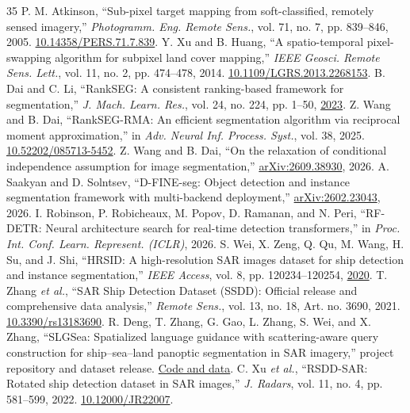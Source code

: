 \documentclass[journal]{IEEEtran}
\begin{document}
\begin{thebibliography}{35}
 P. M. Atkinson, ``Sub-pixel target mapping from soft-classified, remotely sensed imagery,'' \emph{Photogramm. Eng. Remote Sens.}, vol. 71, no. 7, pp. 839--846, 2005. \href{https://doi.org/10.14358/PERS.71.7.839}{10.14358/PERS.71.7.839}.
 Y. Xu and B. Huang, ``A spatio-temporal pixel-swapping algorithm for subpixel land cover mapping,'' \emph{IEEE Geosci. Remote Sens. Lett.}, vol. 11, no. 2, pp. 474--478, 2014. \href{https://doi.org/10.1109/LGRS.2013.2268153}{10.1109/LGRS.2013.2268153}.
 B. Dai and C. Li, ``RankSEG: A consistent ranking-based framework for segmentation,'' \emph{J. Mach. Learn. Res.}, vol. 24, no. 224, pp. 1--50, \href{https://www.jmlr.org/papers/v24/22-0712.html}{2023}.
 Z. Wang and B. Dai, ``RankSEG-RMA: An efficient segmentation algorithm via reciprocal moment approximation,'' in \emph{Adv. Neural Inf. Process. Syst.}, vol. 38, 2025. \href{https://doi.org/10.52202/085713-5452}{10.52202/085713-5452}.
 Z. Wang and B. Dai, ``On the relaxation of conditional independence assumption for image segmentation,'' \href{https://arxiv.org/abs/2609.38930}{arXiv:2609.38930}, 2026.
 A. Saakyan and D. Solntsev, ``D-FINE-seg: Object detection and instance segmentation framework with multi-backend deployment,'' \href{https://arxiv.org/abs/2602.23043}{arXiv:2602.23043}, 2026.
 I. Robinson, P. Robicheaux, M. Popov, D. Ramanan, and N. Peri, ``RF-DETR: Neural architecture search for real-time detection transformers,'' in \emph{Proc. Int. Conf. Learn. Represent. (ICLR)}, 2026.
 S. Wei, X. Zeng, Q. Qu, M. Wang, H. Su, and J. Shi, ``HRSID: A high-resolution SAR images dataset for ship detection and instance segmentation,'' \emph{IEEE Access}, vol. 8, pp. 120234--120254, \href{https://doi.org/10.1109/ACCESS.2020.3005861}{2020}.
 T. Zhang \emph{et al.}, ``SAR Ship Detection Dataset (SSDD): Official release and comprehensive data analysis,'' \emph{Remote Sens.}, vol. 13, no. 18, Art. no. 3690, 2021. \href{https://doi.org/10.3390/rs13183690}{10.3390/rs13183690}.
 R. Deng, T. Zhang, G. Gao, L. Zhang, S. Wei, and X. Zhang, ``SLGSea: Spatialized language guidance with scattering-aware query construction for ship--sea--land panoptic segmentation in SAR imagery,'' project repository and dataset release. \href{https://github.com/deng1218/SLGSea}{Code and data}.
 C. Xu \emph{et al.}, ``RSDD-SAR: Rotated ship detection dataset in SAR images,'' \emph{J. Radars}, vol. 11, no. 4, pp. 581--599, 2022. \href{https://doi.org/10.12000/JR22007}{10.12000/JR22007}.

\end{thebibliography}
\end{document}
